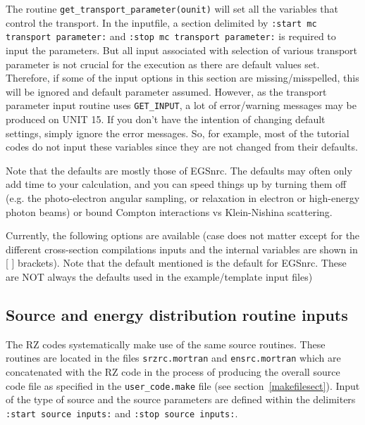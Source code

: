 \documentclass[12pt,twoside]{article}  %
\begin{document}
The routine \verb+get_transport_parameter(ounit)+ will set all
the variables that control the transport. In the inputfile, a section
delimited by \verb+:start mc transport parameter:+ and
\verb+:stop mc transport parameter:+ is required to input the parameters.
But all input associated with selection of various transport parameter
is not crucial for the execution as there are default values set.
Therefore, if some of the input options in this section are
missing/misspelled, this will be ignored and default parameter assumed.
However, as the transport parameter input routine uses \verb+GET_INPUT+, a lot
of error/warning messages may be produced on UNIT 15.
If you don't have the intention of changing default settings,
simply ignore the error messages. So, for example, most of the tutorial
codes do not input these variables since they are not changed from their
defaults.

Note that the defaults are mostly those of EGSnrc.  The defaults may
often only add time to your calculation, and you can speed things up by
turning them off (e.g. the photo-electron angular sampling, or relaxation
in electron or high-energy photon beams) or bound Compton interactions
vs Klein-Nishina scattering.


  Currently, the following options are available (case does not matter 
except for the different cross-section compilations inputs and 
the internal variables are shown in [ ] brackets). 
Note that the default mentioned is the default  for EGSnrc. These are 
NOT always the defaults
used in the example/template input files)  



\newpage      %

\subsection{Source and energy distribution routine inputs}
\label{source_inputs}

The RZ codes systematically make use of the same source routines.
These routines are located in the files \verb+srzrc.mortran+ 
and \verb+ensrc.mortran+ which are concatenated with the RZ code 
in the process of producing the overall source code file as specified in 
the \verb+user_code.make+ file (see section~\ref{makefilesect}).
Input of the type of source and the source parameters are defined 
within the delimiters \verb+:start source inputs:+ and
\verb+:stop source inputs:+.
\end{document}
